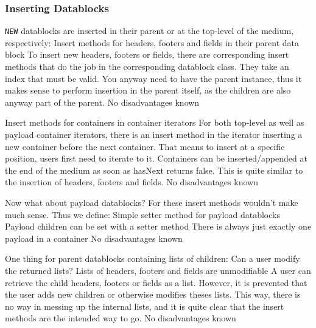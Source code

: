\subsubsection{Inserting Datablocks}%
\label{sec:InsertingDatablocks}%

\texttt{NEW} datablocks are inserted in their parent or at the top-level of the medium, respectively:
{%
Insert methods for headers, footers and fields in their parent data block
}
{%
To insert new headers, footers or fields, there are corresponding insert methods that do the job in the corresponding datablock class. They take an index that must be valid.
}
{%
You anyway need to have the parent instance, thus it makes sense to perform insertion in the parent itself, as the children are also anyway part of the parent.
}
{%
No disadvantages known
}

{%
Insert methods for containers in container iterators
}
{%
For both top-level as well as payload container iterators, there is an insert method in the iterator inserting a new container before the next container. That means to insert at a specific position, users first need to iterate to it. Containers can be inserted/appended at the end of the medium as soon as hasNext returns false. 
}
{%
This is quite similar to the insertion of headers, footers and fields.
}
{%
No disadvantages known
}

Now what about payload datablocks? For these insert methods wouldn't make much sense. Thus we define:
{%
Simple setter method for payload datablocks
}
{%
Payload children can be set with a setter method
}
{%
There is always just exactly one payload in a container
}
{%
No disadvantages known
}

One thing for parent datablocks containing lists of children: Can a user modify the returned lists?
{%
Lists of headers, footers and fields are unmodifiable
}
{%
A user can retrieve the child headers, footers or fields as a list. However, it is prevented that the user adds new children or otherwise modifies theses lists.
}
{%
This way, there is no way in messing up the internal lists, and it is quite clear that the insert methods are the intended way to go.
}
{%
No disadvantages known
}

